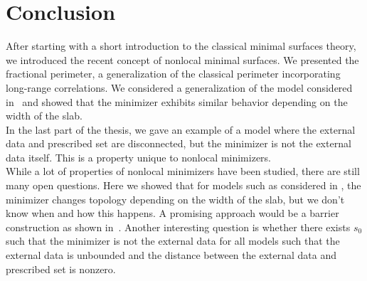 \chapter{Conclusion}
\label{ch:conclusion}

After starting with a short introduction to the classical minimal surfaces theory, we introduced
the recent concept of nonlocal minimal surfaces. We presented the fractional perimeter, a generalization
of the classical perimeter incorporating long-range correlations. We considered a generalization of
the model considered in~\cite{dipierro2020disconnectedness} and showed that the minimizer exhibits
similar behavior depending on the width of the slab. \\ 

In the last part of the thesis, we gave an example of a model where the external data and prescribed
set are disconnected, but the minimizer is not the external data itself. This is a property unique
to nonlocal minimizers. \\ 

While a lot of properties of nonlocal minimizers have been studied, there are still many open
questions. Here we showed that for models such as considered in , the minimizer
changes topology depending on the width of the slab, but we don't know when and how this happens.
A promising approach would be a barrier construction as shown in~\cite{dipierro2012asymptotics}.
Another interesting question is whether there exists \( s_{0}  \) such that the minimizer is not
the external data for all models such that the external data is unbounded and the distance between
the external data and prescribed set is nonzero.
